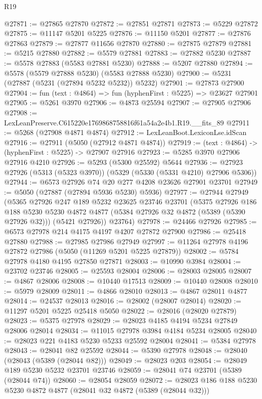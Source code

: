 \begin{lexlean}{R19}
\begin{coremodule}
@27871 := @27865 @27870
@27872 := @27851 @27871
@27873 := @5229 @27872
@27875 := @11147 @5201 @5225
@27876 := @11150 @5201
@27877 := @27876 @27863
@27879 := @27877 @11656 @27870
@27880 := @27875 @27879
@27881 := @5215 @27880
@27882 := @5579 @27881
@27883 := @27882 @5230
@27887 := @5578 @27883 (@5583 @27881 @5230)
@27888 := @5207 @27880
@27894 := @5578 (@5579 @27888 @5230) (@5583 @27888 @5230)
@27900 := @5231 (@27887 (@5231 (@27894 @5232 @5232)) @5232)
@27901 := @27873 @27900
@27904 := fun (text : @4864) => fun (hyphenFirst : @5225) => @23627 @27901
@27905 := @5261 @3970
@27906 := @4873 @25594
@27907 := @27905 @27906
@27908 := LexLeanPreserve.C615220e1769868758816f61a54a2e4b1.R19.__fits_89
@27911 := @5268 (@27908 @4871 @4874)
@27912 := LexLeanBoot.LexiconLse.idScan
@27916 := @27911 (@5050 (@27912 @4871 @4874))
@27919 := (text : @4864) -> (hyphenFirst : @5225) -> @27907 @27916
@27923 := @5285 @3970 @27906 @27916 @4210
@27926 := @5293 (@5300 @25592) @5644
@27936 := @27923 @27926 (@5313 (@5323 @3970)) (@5329 (@5330 (@5331 @4210) @27906 @5306))
@27944 := @6573 @27926 @74 @20 @277 @4208 @23626 @27901 @23701
@27949 := @5050 (@27887 (@27894 @5936 @5230) @5936)
@27977 := @27944
    @27949
    (@5365
      @27926
      @247
      @189
      @5232
      @23625
      @23746
      @23701
      (@5375
        @27926
        @186
        @188
        @5230
        @5230
        @4872
        @4877
        (@5384 @27926 @32 @4872 (@5389 (@5390 @27926 @32)))
        (@5421 @27926))
      @23764)
@27978 := @24466 @27926
@27985 := @6573 @27978 @214 @4175 @4197 @4207 @27872 @27900
@27986 := @25418 @27880
@27988 := @27985 @27986 @27949
@27997 := @11264 @27978 @4196 @27872 @27986 (@5050 (@11269 @5201 @5225 @27879))
@28002 := @5784 @27978 @4180 @4195 @27850 @27871
@28003 := @10990 @3984
@28004 := @23702 @23746
@28005 := @25593 @28004
@28006 := @28003 @28005
@28007 := @4867 @28006
@28008 := @10440 @17513
@28009 := @10440 @28008
@28010 := @5979 @28009
@28011 := @4866 @28010
@28013 := @4867 @28011 @4877
@28014 := @24537 @28013
@28016 := @28002 (@28007 @28014)
@28020 := @11297 @5201 @5225 @25418 @5050
@28022 := @28016 (@28020 @27879)
@28023 := @5375 @27978
@28029 := @28023 @4185 @4194 @5234 @27849 @28006 @28014
@28034 := @11015 @27978 @3984 @4184 @5234 @28005
@28040 := @28023 @221 @4183 @5230 @5233 @25592 @28004
@28041 := @5384 @27978
@28043 := @28041 @82 @25592
@28044 := @5390 @27978
@28048 := @28040 (@28043 (@5389 (@28044 @82)))
@28049 := @28023 @203
@28054 := @28049 @189 @5230 @5232 @23701 @23746
@28059 := @28041 @74 @23701 (@5389 (@28044 @74))
@28060 := @28054 @28059
@28072 := @28023 @186 @188 @5230 @5230 @4872 @4877 (@28041 @32 @4872 (@5389 (@28044 @32)))

\end{coremodule}
\end{lexlean}
